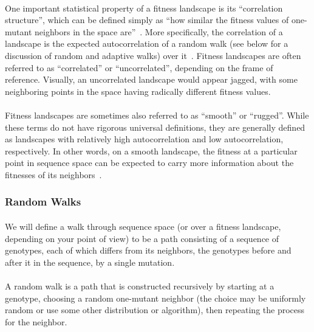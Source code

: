 \documentclass[12pt,letterpaper,titlepage]{article}
\begin{document}
\paragraph{}
One important statistical property of a fitness landscape is its ``correlation
structure'', which can be defined simply as ``how similar the fitness values of
one-mutant neighbors in the space are''~\cite{Kauffman1993}. More specifically,
the correlation of a landscape is the expected autocorrelation of a random walk
(see below for a discussion of random and adaptive walks) over
it~\cite{Weinberger1990}. Fitness landscapes are often referred to as
``correlated'' or ``uncorrelated'', depending on the frame of reference.
Visually, an uncorrelated landscape would appear jagged, with some neighboring
points in the space having radically different fitness values.

\paragraph{}
Fitness landscapes are sometimes also referred to as ``smooth'' or ``rugged''.
While these terms do not have rigorous universal definitions, they are
generally defined as landscapes with relatively high autocorrelation and low
autocorrelation, respectively. In other words, on a smooth landscape, the
fitness at a particular point in sequence space can be expected to carry more
information about the fitnesses of its neighbors~\cite{Kauffman1993}.

\subsubsection{Random Walks}

\paragraph{}
We will define a walk through sequence space (or over a fitness landscape,
depending on your point of view) to be a path consisting of a sequence of
genotypes, each of which differs from its neighbors, the genotypes before and
after it in the sequence, by a single mutation.

\paragraph{}
A random walk is a path that is constructed recursively by starting at a
genotype, choosing a random one-mutant neighbor (the choice may be uniformly
random or use some other distribution or algorithm), then repeating the process
for the neighbor.
\end{document}

